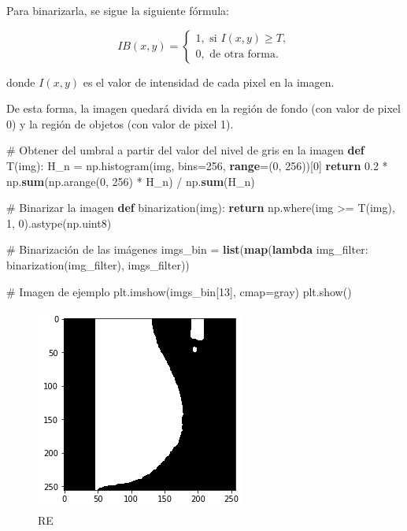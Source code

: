 \documentclass[
]{article}
\newenvironment{Shaded}{\begin{snugshade}}{\end{snugshade}}
\newcommand{\BuiltInTok}[1]{\textcolor[rgb]{0.39,0.29,0.61}{\textbf{#1}}}
\newcommand{\CommentTok}[1]{\textcolor[rgb]{0.54,0.53,0.53}{#1}}
\newcommand{\ControlFlowTok}[1]{\textcolor[rgb]{0.12,0.11,0.11}{\textbf{#1}}}
\newcommand{\DecValTok}[1]{\textcolor[rgb]{0.69,0.50,0.00}{#1}}
\newcommand{\FloatTok}[1]{\textcolor[rgb]{0.69,0.50,0.00}{#1}}
\newcommand{\KeywordTok}[1]{\textcolor[rgb]{0.12,0.11,0.11}{\textbf{#1}}}
\newcommand{\NormalTok}[1]{\textcolor[rgb]{0.12,0.11,0.11}{#1}}
\newcommand{\OperatorTok}[1]{\textcolor[rgb]{0.12,0.11,0.11}{#1}}
\newcommand{\StringTok}[1]{\textcolor[rgb]{0.75,0.01,0.01}{#1}}
\begin{document}
Para binarizarla, se sigue la siguiente fórmula:

\[
IB(x, y)  = \begin{cases}
    1,\text{ si } I(x,y) \geq T,\\
    0, \text{ de otra forma}.
  \end{cases}
\]

donde \(I(x, y)\) es el valor de intensidad de cada pixel en la imagen.

De esta forma, la imagen quedará divida en la región de fondo (con valor
de pixel 0) y la región de objetos (con valor de pixel 1).

\begin{Shaded}
\begin{Highlighting}[]
\CommentTok{\# Obtener del umbral a partir del valor del nivel de gris en la imagen}
\KeywordTok{def}\NormalTok{ T(img):}
\NormalTok{    H\_n }\OperatorTok{=}\NormalTok{ np.histogram(img, bins}\OperatorTok{=}\DecValTok{256}\NormalTok{, }\BuiltInTok{range}\OperatorTok{=}\NormalTok{(}\DecValTok{0}\NormalTok{, }\DecValTok{256}\NormalTok{))[}\DecValTok{0}\NormalTok{]}
    \ControlFlowTok{return} \FloatTok{0.2} \OperatorTok{*}\NormalTok{ np.}\BuiltInTok{sum}\NormalTok{(np.arange(}\DecValTok{0}\NormalTok{, }\DecValTok{256}\NormalTok{) }\OperatorTok{*}\NormalTok{ H\_n) }\OperatorTok{/}\NormalTok{ np.}\BuiltInTok{sum}\NormalTok{(H\_n)}

\CommentTok{\# Binarizar la imagen}
\KeywordTok{def}\NormalTok{ binarization(img):}
    \ControlFlowTok{return}\NormalTok{ np.where(img }\OperatorTok{\textgreater{}=}\NormalTok{ T(img), }\DecValTok{1}\NormalTok{, }\DecValTok{0}\NormalTok{).astype(np.uint8)}

\CommentTok{\# Binarización de las imágenes}
\NormalTok{imgs\_bin }\OperatorTok{=} \BuiltInTok{list}\NormalTok{(}\BuiltInTok{map}\NormalTok{(}\KeywordTok{lambda}\NormalTok{ img\_filter: binarization(img\_filter), imgs\_filter))}

\CommentTok{\# Imagen de ejemplo}
\NormalTok{plt.imshow(imgs\_bin[}\DecValTok{13}\NormalTok{], cmap}\OperatorTok{=}\StringTok{\textquotesingle{}gray\textquotesingle{}}\NormalTok{)}
\NormalTok{plt.show()}
\end{Highlighting}
\end{Shaded}

\begin{figure}
\centering
\includegraphics{img/tarea_2_3.png}
\caption{RE}
\end{figure}
\end{document}
